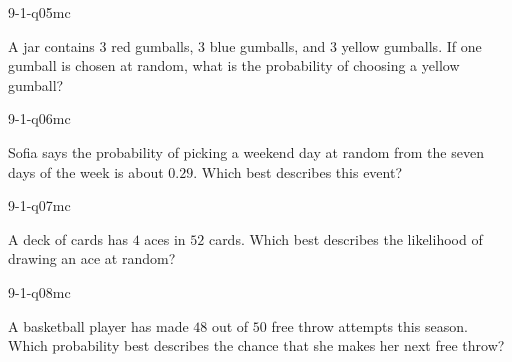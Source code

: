 \begin{practiceQuestion}{9-1-q05}{mc}
\begin{questionText}
A jar contains $3$ red gumballs, $3$ blue gumballs, and $3$ yellow gumballs. If one gumball is chosen at random, what is the probability of choosing a yellow gumball?
\end{questionText}
\end{practiceQuestion}

\begin{practiceQuestion}{9-1-q06}{mc}
\begin{questionText}
Sofia says the probability of picking a weekend day at random from the seven days of the week is about $0.29$. Which best describes this event?
\end{questionText}
\end{practiceQuestion}

\begin{practiceQuestion}{9-1-q07}{mc}
\begin{questionText}
A deck of cards has $4$ aces in $52$ cards. Which best describes the likelihood of drawing an ace at random?
\end{questionText}
\end{practiceQuestion}

\begin{practiceQuestion}{9-1-q08}{mc}
\begin{questionText}
A basketball player has made $48$ out of $50$ free throw attempts this season. Which probability best describes the chance that she makes her next free throw?
\end{questionText}
\end{practiceQuestion}


